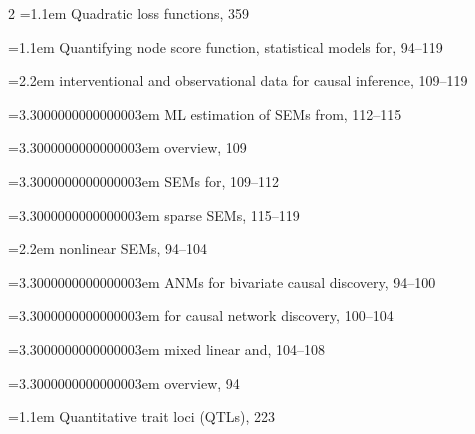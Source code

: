 \begin{multicols}{2}
\noindent\hangindent=1.1em Quadratic loss functions, 359\par
\noindent\hangindent=1.1em Quantifying node score function, statistical models for, 94--119\par
\noindent\hangindent=2.2em \hspace*{1.1em}interventional and observational data for causal inference, 109--119\par
\noindent\hangindent=3.3000000000000003em \hspace*{2.2em}ML estimation of SEMs from, 112--115\par
\noindent\hangindent=3.3000000000000003em \hspace*{2.2em}overview, 109\par
\noindent\hangindent=3.3000000000000003em \hspace*{2.2em}SEMs for, 109--112\par
\noindent\hangindent=3.3000000000000003em \hspace*{2.2em}sparse SEMs, 115--119\par
\noindent\hangindent=2.2em \hspace*{1.1em}nonlinear SEMs, 94--104\par
\noindent\hangindent=3.3000000000000003em \hspace*{2.2em}ANMs for bivariate causal discovery, 94--100\par
\noindent\hangindent=3.3000000000000003em \hspace*{2.2em}for causal network discovery, 100--104\par
\noindent\hangindent=3.3000000000000003em \hspace*{2.2em}mixed linear and, 104--108\par
\noindent\hangindent=3.3000000000000003em \hspace*{2.2em}overview, 94\par
\noindent\hangindent=1.1em Quantitative trait loci (QTLs), 223\par


\end{multicols}

